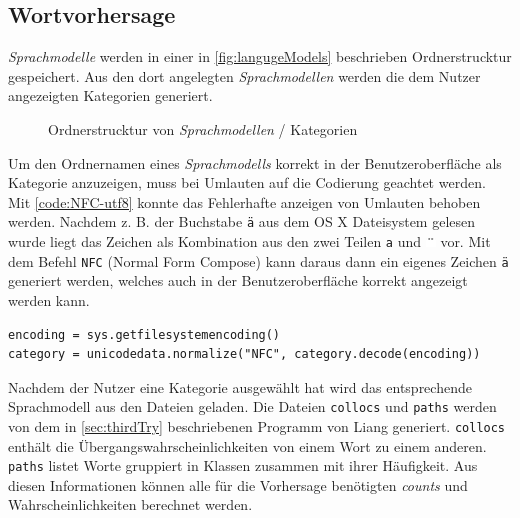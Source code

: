 \subsection{Wortvorhersage}
	\label{sec:implemetation-wordPredition}
	
    \emph{Sprachmodelle} werden in einer in \autoref{fig:langugeModels} beschrieben Ordnerstrucktur gespeichert. Aus den dort angelegten \emph{Sprachmodellen} werden die dem Nutzer angezeigten Kategorien generiert.
    
    \begin{figure}[H]
            \caption{Ordnerstrucktur von \emph{Sprachmodellen} / Kategorien}
			\label{fig:langugeModels}
	\end{figure}
    
    Um den Ordnernamen eines \emph{Sprachmodells} korrekt in der Benutzeroberfläche als Kategorie anzuzeigen, muss bei Umlauten auf die Codierung geachtet werden. Mit \autoref{code:NFC-utf8} konnte das Fehlerhafte anzeigen von Umlauten behoben werden. Nachdem z. B. der Buchstabe \texttt{ä} aus dem OS X Dateisystem gelesen wurde liegt das Zeichen als Kombination aus den zwei Teilen \texttt{a} und \includegraphics[]{images/dots.png} vor. Mit dem Befehl \texttt{NFC} (Normal Form Compose) kann daraus dann ein eigenes Zeichen \texttt{ä} generiert werden, welches auch in der Benutzeroberfläche korrekt angezeigt werden kann.
    
    \begin{lstlisting}[caption=Dekodierung von Ordnernamen,label=code:NFC-utf8, captionpos=b]
encoding = sys.getfilesystemencoding()
category = unicodedata.normalize("NFC", category.decode(encoding))
    \end{lstlisting}
    
    Nachdem der Nutzer eine Kategorie ausgewählt hat wird das entsprechende Sprachmodell aus den Dateien geladen. Die Dateien \texttt{collocs} und \texttt{paths} werden von dem in \autoref{sec:thirdTry} beschriebenen Programm von Liang generiert. \texttt{collocs} enthält die Übergangswahrscheinlichkeiten von einem Wort zu einem anderen. \texttt{paths} listet Worte gruppiert in Klassen zusammen mit ihrer Häufigkeit. Aus diesen Informationen können alle für die Vorhersage benötigten \emph{counts} und Wahrscheinlichkeiten berechnet werden.
    
